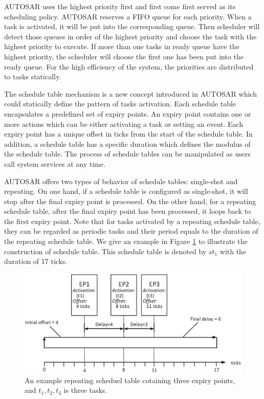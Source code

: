 \documentclass[sigconf]{acmart}
\begin{document}
AUTOSAR uses the highest priority first and first come first served as its scheduling policy. AUTOSAR reserves a FIFO queue for each priority. When a task is activated, it will be put into the corresponding queue. Then scheduler will detect those queues in order of the highest priority and choose the task with the highest priority to execute. If more than one tasks in ready queue have the highest priority, the scheduler will choose the first one has been put into the ready queue. For the high efficiency of the system, the priorities are distributed to tasks statically.

The schedule table mechanism is a new concept introduced in AUTOSAR which could statically define the pattern of tasks activation. Each schedule table encapsulates a predefined set of expiry points. An expiry point contains one or more actions which can be either activating a task or setting an event. Each expiry point has a unique offset in ticks from the start of the schedule table. In addition, a schedule table has a specific duration which defines the modulus of the schedule table. The process of schedule tables can be manipulated as users call system services at any time.

AUTOSAR offers two types of behavior of schedule tables: single-shot and repeating. On one hand, if a schedule table is configured as single-shot, it will stop after the final expiry point is processed. On the other hand, for a repeating schedule table, after the final expiry point has been processed, it loops back to the first expiry point. Note that for tasks activated by a repeating schedule table, they can be regarded as periodic tasks and their period equals to the duration of the repeating schedule table. We give an example in Figure \ref{figure_st1} to illustrate the construction of schedule table. This schedule table is denoted by $st_1$ with the duration of 17 ticks.
\begin{figure}[t]
  \centering
  \includegraphics[scale=.32]{graphics/figure_st1.eps}
  \caption{An example repeating scheduel table cotaining three expiry points, and $t_1,t_2,t_3$ is three tasks.}
  \label{figure_st1}
\end{figure}
\end{document}
